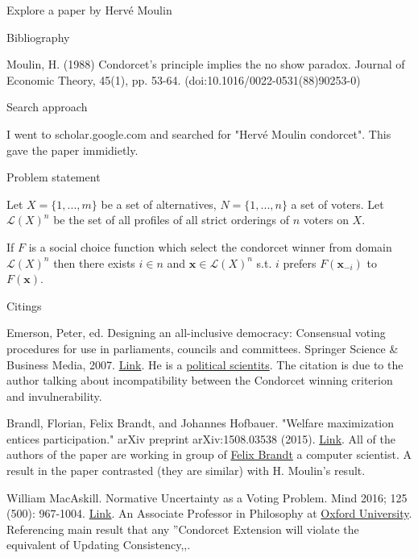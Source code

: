 \documentclass[12pt]{article}
\newenvironment{question}[2][Question]{\begin{trivlist}
\item[\hskip \labelsep {\bfseries #1}\hskip \labelsep {\bfseries #2.}]}{\end{trivlist}}
\newenvironment{answer}[2][Answer]{\begin{trivlist}
\item[\hskip \labelsep {\bfseries #1}\hskip \labelsep {\bfseries #2:}]}{\end{trivlist}}
\begin{document}
\begin{question}{2}

Explore a paper by Hervé Moulin
\end{question}
\begin{answer}{a)}{Bibliography}

Moulin, H. (1988) Condorcet's principle implies the no show paradox. Journal of Economic Theory, 45(1), pp. 53-64. (doi:10.1016/0022-0531(88)90253-0)
\end{answer}

\begin{answer}{b)}{Search approach}

I went to scholar.google.com and searched for "Hervé Moulin condorcet". This gave the paper immidietly.
\end{answer}

\begin{answer}{c)}{Problem statement}

Let $X=\{1, ..., m \}$ be a set of alternatives, $N=\{1, ..., n \}$ a set of voters. Let $\mathcal{L}(X)^n$ be the set of all profiles of all strict orderings of $n$ voters on $X$.

If $F$ is a social choice function which select the condorcet winner from domain $\mathcal{L}(X)^n$ then there exists $i \in n$ and $\boldsymbol{x} \in \mathcal{L}(X)^n$ s.t. $i$ prefers $F(\boldsymbol{x}_{-i})$ to $F(\boldsymbol{x})$.
\end{answer}

\begin{answer}{d)}{Citings}

Emerson, Peter, ed. Designing an all-inclusive democracy: Consensual voting procedures for use in parliaments, councils and committees. Springer Science \& Business Media, 2007. \href{https://books.google.nl/books?hl=en&lr=&id=9mM67vrwz64C&oi=fnd&pg=PR7&ots=4racgvSsRl&sig=UY4F1d51wmhIVBF9R7YL6Upf3j8#v=onepage&q&f=false}{Link}.
He is a \href{https://www.researchgate.net/profile/Peter_Emerson/info}{political scientits}.
The citation is due to the author talking about incompatibility between the Condorcet winning criterion and invulnerability.

Brandl, Florian, Felix Brandt, and Johannes Hofbauer. "Welfare maximization entices participation." arXiv preprint arXiv:1508.03538 (2015).
\href{https://arxiv.org/pdf/1508.03538.pdf}{Link}.
All of the authors of the paper are working in group of \href{http://dss.in.tum.de/staff/brandt.html}{Felix Brandt} a computer scientist.
A result in the paper contrasted (they are similar) with H. Moulin's result.

William MacAskill. Normative Uncertainty as a Voting Problem. Mind 2016; 125 (500): 967-1004.
\href{https://academic.oup.com/mind/article-lookup/doi/10.1093/mind/fzv169}{Link}.
An Associate Professor in Philosophy at \href{https://www.fhi.ox.ac.uk/team/william-macaskill/}{Oxford University}.
Referencing main result that any ''Condorcet Extension will violate the equivalent of Updating Consistency,,.
\end{answer}
\end{document}
